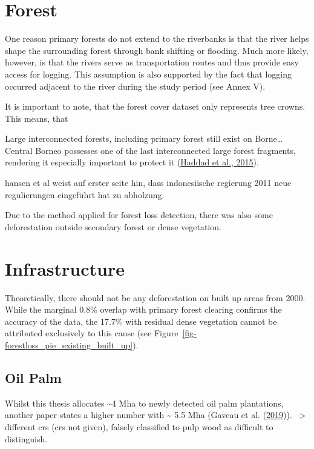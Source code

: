 \documentclass[
  letterpaper,
  DIV=11,
  numbers=noendperiod]{scrreprt}
\begin{document}
\hypertarget{forest}{%
\section{Forest}\label{forest}}

One reason primary forests do not extend to the riverbanks is that the
river helps shape the surrounding forest through bank shifting or
flooding. Much more likely, however, is that the rivers serve as
transportation routes and thus provide easy access for logging. This
assumption is also supported by the fact that logging occurred adjacent
to the river during the study period (see Annex V).

It is important to note, that the forest cover dataset only represents
tree crowns. This means, that

Large interconnected forests, including primary forest still exist on
Borne\ldots{} Central Borneo possesses one of the last interconnected
large forest fragments, rendering it especially important to protect it
(\protect\hyperlink{ref-haddadHabitatFragmentationIts2015a}{Haddad et
al., 2015}).

hansen et al weist auf erster seite hin, dass indonesiische regierung
2011 neue regulierungen eingeführt hat zu abholzung.

Due to the method applied for forest loss detection, there was also some
deforestation outside secondary forest or dense vegetation.

\hypertarget{infrastructure-1}{%
\section{Infrastructure}\label{infrastructure-1}}

Theoretically, there should not be any deforestation on built up areas
from 2000. While the marginal 0.8\% overlap with primary forest clearing
confirms the accuracy of the data, the 17.7\% with residual dense
vegetation cannot be attributed exclusively to this cause (see
Figure~\ref{fig-forestloss_pie_existing_built_up}).

\hypertarget{oil-palm-1}{%
\subsection{Oil Palm}\label{oil-palm-1}}

Whilst this thesis allocates \textasciitilde4 Mha to newly detected oil
palm plantations, another paper states a higher number with
\textasciitilde{} 5.5 Mha (Gaveau et al.
(\protect\hyperlink{ref-gaveauRiseFallForest2019}{2019})).
--\textgreater{} different crs (crs not given), falsely classified to
pulp wood as difficult to distinguish.
\end{document}
